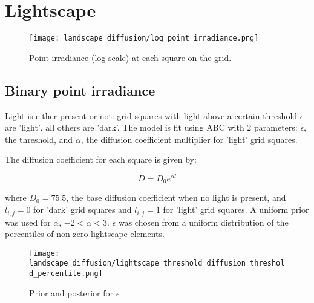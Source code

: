 



\section{Lightscape} 

\begin{figure} [h]
    \centering
    \texttt{[image: landscape\_diffusion/log\_point\_irradiance.png]}
    \label{fig:point_irradiance}
    \caption{Point irradiance (log scale) at each square on the grid.}
\end{figure}

\subsection{Binary point irradiance}
Light is either present or not: grid squares with light above a certain
threshold $\epsilon$ are 'light', all others are 'dark'. The model is fit using
ABC with 2 parameters: $\epsilon$, the threshold, and $\alpha$, the diffusion
coefficient multiplier for 'light' grid squares.

The diffusion coefficient for each square is given by:

$$D = D_0 e^{\alpha l} $$ 

where $D_0 = 75.5$, the base diffusion coefficient when no light is present, and
$l_{i,j} = 0$ for 'dark' grid squares and $l_{i,j} = 1$ for 'light' grid
squares. A uniform prior was used for $\alpha$, $-2 < \alpha < 3$. $\epsilon$
was chosen from a uniform distribution of the percentiles of non-zero lightscape
elements. 



\begin{figure} [h]
    \centering
    \texttt{[image: landscape\_diffusion/lightscape\_threshold\_diffusion\_threshold\_percentile.png]}
    \label{fig:epsilon_threshold}
    \caption{Prior and posterior for $\epsilon$}
\end{figure}


